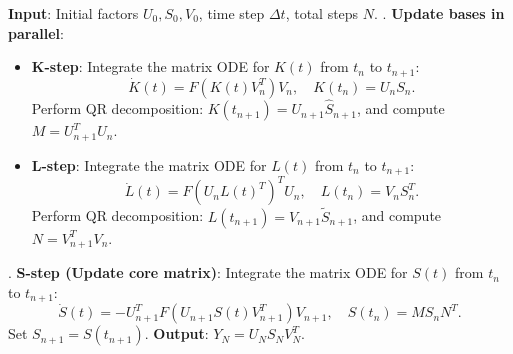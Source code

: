 \documentclass[preprint,11pt]{elsarticle}
\begin{document}
\begin{algorithm}[!h]
    \caption{The unconventional integrator}
    \label{alg: unconventional integrator}
    \begin{algorithmic}
        \STATE \textbf{Input}: Initial factors $U_0, S_0, V_0$, time step $\Delta t$, total steps $N$.
            . \textbf{Update bases in parallel}:
            \begin{itemize}
                \item \textbf{K-step}: Integrate the matrix ODE for $K(t)$ from $t_n$ to $t_{n+1}$:
                \begin{equation*}
                    \dot{K}(t) = F(K(t)V_n^T) V_n, \quad K(t_n) = U_n S_n.
                \end{equation*}
                Perform QR decomposition: $K(t_{n+1}) = U_{n+1} \hat{S}_{n+1}$, and compute $M = U_{n+1}^T U_n$.
                
                \item \textbf{L-step}: Integrate the matrix ODE for $L(t)$ from $t_n$ to $t_{n+1}$:
                \begin{equation*}
                    \dot{L}(t) = F(U_n L(t)^T)^T U_n, \quad L(t_n) = V_n S_n^T.
                \end{equation*}
                Perform QR decomposition: $L(t_{n+1}) = V_{n+1} \tilde{S}_{n+1}$, and compute $N = V_{n+1}^T V_n$.
            \end{itemize}
            
            . \textbf{S-step (Update core matrix)}:
            Integrate the matrix ODE for $S(t)$ from $t_n$ to $t_{n+1}$:
            \begin{equation*}
                \dot{S}(t) = -U_{n+1}^T F(U_{n+1} S(t) V_{n+1}^T) V_{n+1}, \quad S(t_n) = M S_n N^T.
            \end{equation*}
            Set $S_{n+1} = S(t_{n+1})$.
        \ENDFOR
        \STATE \textbf{Output}: $Y_N = U_N S_N V_N^T$.
    \end{algorithmic}
\end{algorithm}





\end{document}
